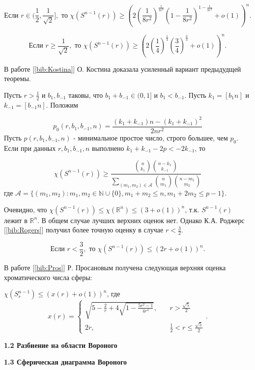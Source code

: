 \begin{theorem1}

$$\text{Если } r \in (\frac{1}{2}, \frac{1}{\sqrt{2}}], \text{ то } 
\chi(S^{n-1}(r)) \geq \left(2(\frac{1}{8r^2})^{\frac{1}{8r^2}}(1-\frac{1}{8r^2})^{1-\frac{1}{8r^2}}+o(1)\right)^n.$$ 

$$\text{Если } r \geq \frac{1}{\sqrt{2}}, \text{ то } 
\chi(S^{n-1}(r)) \geq \left(2(\frac{1}{4})^{\frac{1}{4}}(\frac{3}{4})^{\frac{3}{4}}+o(1)\right)^n.$$

\end{theorem1}
В работе [\ref{bib:Kostina}] О. Костина доказала усиленный вариант предыдудщей теоремы.

\begin{theorem1}
Пусть $r > \tfrac{1}{2}$ и $b_1, b_{-1}$ таковы, что $b_1 + b_{-1} \in (0,1]$ и $b_1 < b_{-1}$.
Пусть $k_1=[b_1n]$ и $k_{-1}=[b_{-1}n]$. Положим

$$p_0(r,b_1,b_{-1},n) = \frac{(k_1 + k_{-1})n - (k_1 + k_{-1})^2}{2nr^2}$$
Пусть $p(r,b_1,b_{-1},n)$ - минимальное простое число, строго большее, чем $p_0$. 
Если при данных $r,b_1,b_{-1},n$ выполнено $k_1 + k_{-1} - 2p < -2k_{-1}$, то

$$\chi(S^{n-1}(r)) \geq 
\frac{\binom{n}{k_1}\binom{n-k_1}{k_{-1}}}
{\sum\limits_{(m_1,m_2) \in \mathcal{A}} \binom{n}{m_1} \binom{n-m_1}{m_2}}$$
где $\mathcal{A} = \{ (m_1,m_2): m_1,m_2 \in \mathbb{N} \cup \{ 0 \}, m_1+m_2 \leq n, m_1+2m_2 \leq p-1 \}$.

\end{theorem1}

Очевидно, что $\chi(S^{n-1}(r)) \leq \chi(\mathbb{R}^n) \leq (3+o(1))^n$, т.к. $S^{n-1}(r)$ лежит в $\mathbb{R}^n$. В общем случае лучших верхних оценок нет. Однако К.А. Роджерс [\ref{bib:Rogers}] получил более точную оценку в случае $r < \frac{3}{2}$.

\begin{theorem1}
$$\text{Если } r < \frac{3}{2}, \text{ то } \chi(S^{n-1}(r)) \leq (2r+o(1))^n.$$
\end{theorem1}

В работе [\ref{bib:Pros}] Р. Просановым получена следующая верхняя оценка хроматического числа сферы:

\begin{theorem1}
$\chi(S_r^{n-1}) \leq (x(r)+o(1))^n$, где
$$ x(r) = 
\begin{cases}
\sqrt{5-\frac{2}{r}+4\sqrt{1-\frac{5r^2-1}{4r^4}}},& \quad r > \frac{\sqrt{5}}{2} \\ 
2r,& \quad \frac{1}{2} < r \leq  \frac{\sqrt{5}}{2}
\end{cases}.$$
\end{theorem1}

\vspace{5pt}
\textbf{1.2 Разбиение на области Вороного}\label{chapters:1.2}
\vspace{5pt}

\vspace{5pt}
\textbf{1.3 Сферическая диаграмма Вороного}\label{chapters:1.3}
\vspace{5pt}